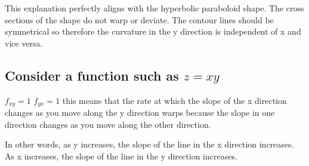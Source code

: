 \documentclass{article}
\begin{document}
This explanation perfectly aligns with the hyperbolic paraboloid shape. The cross sections of the shape do not warp or deviate. The contour lines should be symmetrical so therefore the curvature in the y direction is independent of x and vice versa. 

\subsection{Consider a function such as \( z = xy \)}
\( f_{xy} = 1 \)
\newline
\( f_{yx} = 1 \)
\newline
this means that the rate at which the slope of the x direction changes as you move along the y direction warps because the slope in one direction changes as you move along the other direction. 

In other words, as y increases, the slope of the line in the x direction increases. As x increases, the slope of the line in the y direction increases. 
\end{document}
